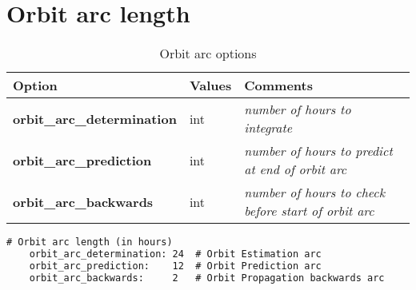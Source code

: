 \section{Orbit arc length}
\begin{table}[h!]
	\begin{tabular}{|p{4.5cm}|p{2cm}|p{3.5cm}|}
		\hline
		Option & Values & Comments \\
		\hline
		\textbf{orbit\_arc\_determination} & int &\emph{number of hours to integrate}\\
		\textbf{orbit\_arc\_prediction} & int &  \emph{number of hours to predict at end of orbit arc}\\
		\textbf{orbit\_arc\_backwards} & int & \emph{number of hours to check before start of orbit arc}\\
		\hline
	\end{tabular}
	\caption{Orbit arc options}
	\label{table:yaml}
\end{table}
%
{\small
\begin{lstlisting}[language=xml,caption=orbit arc length yaml configuration example]
# Orbit arc length (in hours)
	orbit_arc_determination: 24  # Orbit Estimation arc
	orbit_arc_prediction:    12  # Orbit Prediction arc
	orbit_arc_backwards:     2   # Orbit Propagation backwards arc
\end{lstlisting}
}
%
